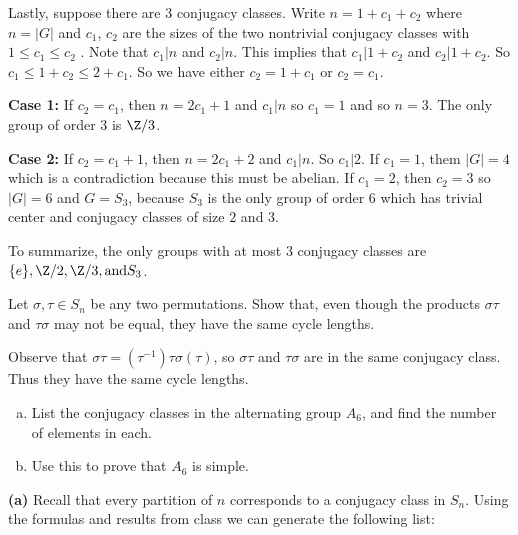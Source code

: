 \documentclass[11pt,letterpaper]{article}
\begin{document}
Lastly, suppose there are $3$ conjugacy classes. Write $n=1+c_1+c_2$ where $n=|G|$ and $c_1$, $c_2$ are the sizes of the two nontrivial conjugacy classes with $1\leq c_1\leq c_2$ . Note that $c_1|n$ and $c_2|n$. This implies that $c_1|1+c_2$ and $c_2|1+c_2$. So $c_1\leq 1+c_2\leq 2+c_1$. So we have either $c_2=1+c_1$ or $c_2=c_1$.

\textbf{Case 1:} If $c_2=c_1$, then $n=2c_1+1$ and $c_1|n$ so $c_1=1$ and so $n=3$. The only group of order $3$ is $\Z/3$.

\textbf{Case 2:} If $c_2=c_1+1$, then $n=2c_1+2$ and $c_1|n$. So $c_1|2$. If $c_1=1$, them $|G|=4$ which is a contradiction because this must be abelian. If $c_1=2$, then $c_2=3$ so $|G|=6$ and $G=S_3$, because $S_3$ is the only group of order $6$ which has trivial center and conjugacy classes of size $2$ and $3$.             

To summarize, the only groups with at most 3 conjugacy classes are $\{e\}, \Z/2, \Z/3, \mathrm{ and } S_3$. 

\pagebreak
\begin{problem}
Let $\sigma, \tau \in S_n$ be any two permutations. Show that,
even though the products $\sigma\tau$ and $\tau\sigma$ may not be equal, 
they have the same cycle lengths.
\end{problem}

Observe that $\sigma\tau = (\tau^{-1})\tau \sigma (\tau)$, so $\sigma\tau$ and $\tau\sigma$ are in the same conjugacy class. Thus they have the same cycle lengths.   

\pagebreak
\begin{problem}
  \leavevmode
  \begin{enumerate}[(a)]
    \item List the conjugacy classes in the alternating group $A_6$, and find the number of elements in each.
    \item Use this to prove that $A_6$ is simple.
  \end{enumerate}
\end{problem}

\textbf{(a)} Recall that every partition of $n$ corresponds to a conjugacy class in $S_n$. Using the formulas and results from class we can generate the following list: 
\end{document}
